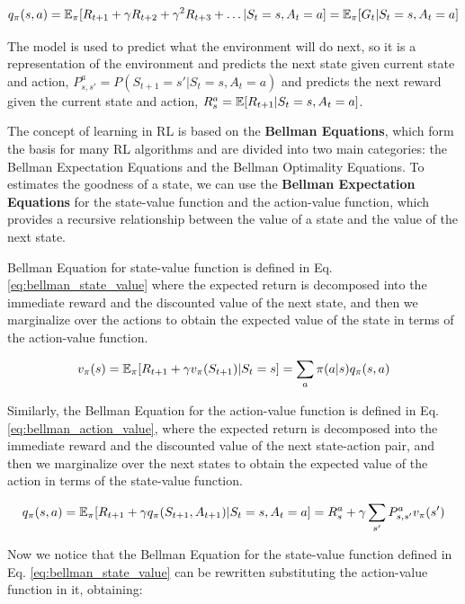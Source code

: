 \begin{equation} \label{eq:action_value_function}
    q_{\pi}(s, a) = \operatorname{\mathbb{E}}_{\pi}[R_{t+1} + \gamma R_{t+2} + \gamma^2 R_{t+3} + \dots | S_t = s, A_t = a] = \operatorname{\mathbb{E}}_{\pi}[G_t | S_t = s, A_t = a]
\end{equation}


The model is used to predict what the environment will do next, so it is a representation of the environment and predicts the next state given current state and action, $P_{s, s'}^a = P(S_{t+1} = s' | S_t = s, A_t = a)$ and predicts the next reward given the current state and action, $R_s^a = \operatorname{\mathbb{E}}[R_{t+1} | S_t = s, A_t = a]$.

The concept of learning in RL is based on the \textbf{Bellman Equations}, which form the basis for many RL algorithms and are divided into two main categories: the Bellman Expectation Equations and the Bellman Optimality Equations.
To estimates the goodness of a state, we can use the \textbf{Bellman Expectation Equations} for the state-value function and the action-value function, which provides a recursive relationship between the value of a state and the value of the next state.

Bellman Equation for state-value function is defined in Eq. \ref{eq:bellman_state_value} where the expected return is decomposed into the immediate reward and the discounted value of the next state, and then we marginalize over the actions to obtain the expected value of the state in terms of the action-value function.

\begin{equation} \label{eq:bellman_state_value}
    v_{\pi}(s) = \operatorname{\mathbb{E}}_{\pi}[R_{t+1} + \gamma v_{\pi}(S_{t+1}) | S_t = s] = \sum_{a} \pi(a|s)q_{\pi}(s, a)
\end{equation}

Similarly, the Bellman Equation for the action-value function is defined in Eq. \ref{eq:bellman_action_value}, where the expected return is decomposed into the immediate reward and the discounted value of the next state-action pair, and then we marginalize over the next states to obtain the expected value of the action in terms of the state-value function.

\begin{equation} \label{eq:bellman_action_value}
    q_{\pi}(s, a) = \operatorname{\mathbb{E}}_{\pi}[R_{t+1} + \gamma q_{\pi}(S_{t+1}, A_{t+1}) | S_t = s, A_t = a] = R_s^a + \gamma \sum_{s'} P_{s, s'}^a v_{\pi}(s')
\end{equation}

Now we notice that the Bellman Equation for the state-value function defined in Eq. \ref{eq:bellman_state_value} can be rewritten substituting the action-value function in it, obtaining:

